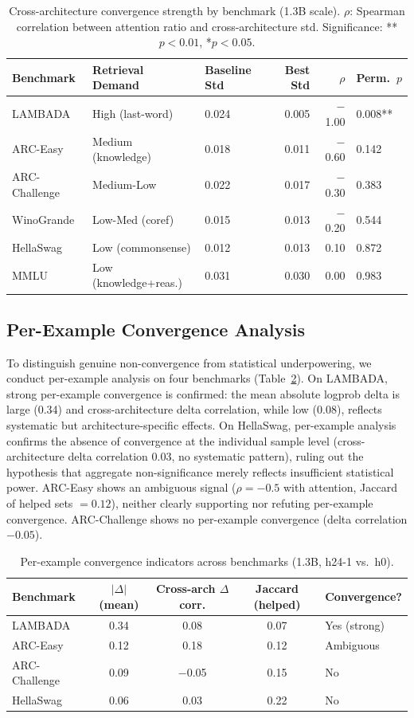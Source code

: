 \documentclass[11pt,a4paper]{article}
\begin{document}
\begin{table}[t]
\centering
\small
\caption{Cross-architecture convergence strength by benchmark (1.3B scale). $\rho$: Spearman correlation between attention ratio and cross-architecture std. Significance: **$p<0.01$, *$p<0.05$.}
\label{tab:convergence}
\begin{tabular}{@{}lllrrl@{}}
\toprule
Benchmark & Retrieval Demand & Baseline Std & Best Std & $\rho$ & Perm.\ $p$ \\
\midrule
LAMBADA & High (last-word) & 0.024 & 0.005 & $-$1.00 & 0.008** \\
ARC-Easy & Medium (knowledge) & 0.018 & 0.011 & $-$0.60 & 0.142 \\
ARC-Challenge & Medium-Low & 0.022 & 0.017 & $-$0.30 & 0.383 \\
WinoGrande & Low-Med (coref) & 0.015 & 0.013 & $-$0.20 & 0.544 \\
HellaSwag & Low (commonsense) & 0.012 & 0.013 & 0.10 & 0.872 \\
MMLU & Low (knowledge+reas.) & 0.031 & 0.030 & 0.00 & 0.983 \\
\bottomrule
\end{tabular}
\end{table}

\subsection{Per-Example Convergence Analysis}
\label{sec:per-example}

To distinguish genuine non-convergence from statistical underpowering, we conduct per-example analysis on four benchmarks (Table~\ref{tab:perexample}). On LAMBADA, strong per-example convergence is confirmed: the mean absolute logprob delta is large (0.34) and cross-architecture delta correlation, while low (0.08), reflects systematic but architecture-specific effects. On HellaSwag, per-example analysis confirms the absence of convergence at the individual sample level (cross-architecture delta correlation 0.03, no systematic pattern), ruling out the hypothesis that aggregate non-significance merely reflects insufficient statistical power. ARC-Easy shows an ambiguous signal ($\rho{=}{-}0.5$ with attention, Jaccard of helped sets $= 0.12$), neither clearly supporting nor refuting per-example convergence. ARC-Challenge shows no per-example convergence (delta correlation $-0.05$).

\begin{table}[t]
\centering
\small
\caption{Per-example convergence indicators across benchmarks (1.3B, h24-1 vs.\ h0).}
\label{tab:perexample}
\begin{tabular}{@{}lcccl@{}}
\toprule
Benchmark & $|\Delta|$ (mean) & Cross-arch $\Delta$ corr. & Jaccard (helped) & Convergence? \\
\midrule
LAMBADA & 0.34 & 0.08 & 0.07 & Yes (strong) \\
ARC-Easy & 0.12 & 0.18 & 0.12 & Ambiguous \\
ARC-Challenge & 0.09 & $-$0.05 & 0.15 & No \\
HellaSwag & 0.06 & 0.03 & 0.22 & No \\
\bottomrule
\end{tabular}
\end{table}
\end{document}
